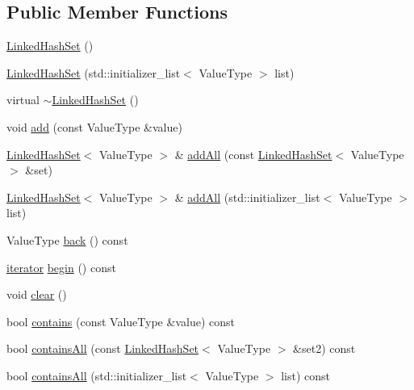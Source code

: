 \subsection*{Public Member Functions}
\begin{DoxyCompactItemize}
\item 
\mbox{\hyperlink{classLinkedHashSet_ac0b98631ae20907b02a2cd67b3bf8962}{Linked\+Hash\+Set}} ()
\item 
\mbox{\hyperlink{classLinkedHashSet_a5859da69d20971c3f5766d14ee017fb3}{Linked\+Hash\+Set}} (std\+::initializer\+\_\+list$<$ Value\+Type $>$ list)
\item 
virtual \mbox{\hyperlink{classLinkedHashSet_aa82a1f13d7dffee0ee0d02df10f7724b}{$\sim$\+Linked\+Hash\+Set}} ()
\item 
void \mbox{\hyperlink{classLinkedHashSet_ab901606bf3a8019c986f0cf9a9f298dc}{add}} (const Value\+Type \&value)
\item 
\mbox{\hyperlink{classLinkedHashSet}{Linked\+Hash\+Set}}$<$ Value\+Type $>$ \& \mbox{\hyperlink{classLinkedHashSet_aea58f348e4d2647373accd2a46b962ea}{add\+All}} (const \mbox{\hyperlink{classLinkedHashSet}{Linked\+Hash\+Set}}$<$ Value\+Type $>$ \&set)
\item 
\mbox{\hyperlink{classLinkedHashSet}{Linked\+Hash\+Set}}$<$ Value\+Type $>$ \& \mbox{\hyperlink{classLinkedHashSet_ab1f3d84428461b3c267afb15c4568c93}{add\+All}} (std\+::initializer\+\_\+list$<$ Value\+Type $>$ list)
\item 
Value\+Type \mbox{\hyperlink{classLinkedHashSet_a38cbd80c93f450dc9bf3ca7c6a6220bd}{back}} () const
\item 
\mbox{\hyperlink{classLinkedHashSet_1_1iterator}{iterator}} \mbox{\hyperlink{classLinkedHashSet_a0c62c15c8ed609e7e5e9518cf5f5c712}{begin}} () const
\item 
void \mbox{\hyperlink{classLinkedHashSet_ac8bb3912a3ce86b15842e79d0b421204}{clear}} ()
\item 
bool \mbox{\hyperlink{classLinkedHashSet_a6fbc1a150987e7e5320d244a3baeb560}{contains}} (const Value\+Type \&value) const
\item 
bool \mbox{\hyperlink{classLinkedHashSet_a76e2466b3e7073d227f714011d14f4b9}{contains\+All}} (const \mbox{\hyperlink{classLinkedHashSet}{Linked\+Hash\+Set}}$<$ Value\+Type $>$ \&set2) const
\item 
bool \mbox{\hyperlink{classLinkedHashSet_ab1015353723ba6d764f48aeceeff5799}{contains\+All}} (std\+::initializer\+\_\+list$<$ Value\+Type $>$ list) const
\item 

\end{DoxyCompactItemize}
